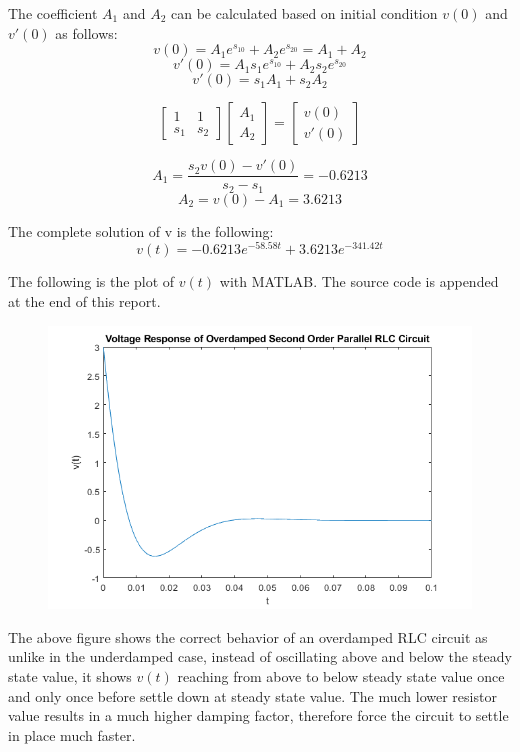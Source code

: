 \documentclass{article}
\begin{document}
The coefficient $A_1$ and $A_2$ can be calculated based on initial condition $v(0)$ and $v'(0)$ as follows:
$$v(0) = A_1e^{s_10} + A_2e^{s_20} = A_1 + A_2$$
$$v'(0) = A_1s_1e^{s_10} + A_2s_2e^{s_20}$$
$$v'(0) = s_1A_1 + s_2A_2$$

$$
\begin{bmatrix}
1 & 1 \\
s_1 & s_2 
\end{bmatrix}
\begin{bmatrix}
A_1\\
A_2
\end{bmatrix}
=
\begin{bmatrix}
v(0)\\
v'(0)
\end{bmatrix}
$$

$$A_1 = \frac{s_2v(0)-v'(0)}{s_2-s_1} = -0.6213$$
$$A_2 = v(0)-A_1 = 3.6213$$

The complete solution of v is the following:
$$v(t)=-0.6213e^{-58.58t}+3.6213e^{-341.42t}$$

The following is the plot of $v(t)$ with MATLAB. The source code is appended at the end of this report.
\begin{figure}[H]
    \centering
        \includegraphics[scale=0.6]{plot4_2.png}
\end{figure}

The above figure shows the correct behavior of an overdamped RLC circuit as unlike in the underdamped case, instead of oscillating above and below the steady state value, it shows $v(t)$ reaching from above to below steady state value once and only once before settle down at steady state value. The much lower resistor value results in a much higher damping factor, therefore force the circuit to settle in place much faster.
\end{document}
